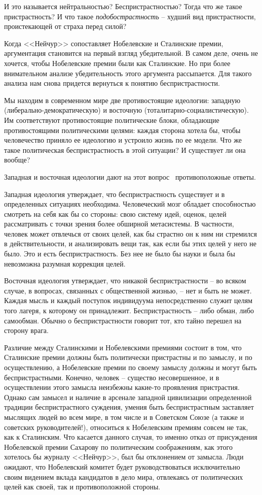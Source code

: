 \documentclass{book}
\begin{document}
И это называется нейтральностью? Беспристрастностью? Тогда что же такое пристрастность? И что такое \textit{подобостра­стность} --  худший вид пристрастности, проистекающей от стра­ха перед силой?

Когда <<Нейчур>> сопоставляет Нобелевские и Сталинские премии, аргументация становится на первый взгляд убедитель­ной. В самом деле, очень не хочется, чтобы Нобелевские пре­мии были как Сталинские. Но при более внимательном анали­зе убедительность этого аргумента рассыпается. Для такого анализа нам снова придется вернуться к понятию бесприст­растности.

Мы находим в современном мире две противостоящие иде­ологии: западную (либерально-демократическую) и восточ­ную (тоталитарно-социалистическую). Им соответствуют проти­востоящие политические блоки, обладающие противостоящи­ми политическими целями: каж\-дая сторона хотела бы, чтобы человечество приняло ее идеологию и устроило жизнь по ее модели. Что же такое политическая беспристрастность в этой ситуации? И существует ли она вообще?

Западная и восточная идеологии дают на этот вопрос  проти­воположные ответы.

Западная идеология утверждает, что беспристрастность су­ществует и в определенных ситуациях необходима. Человече­ский мозг обладает способностью смотреть на себя как бы со стороны: свою систему идей, оценок, целей рассматривать с точки зрения более обширной метасистемы. В частности, человек может отвлечься от своих целей, как бы страстно он к ним ни стремился в действительности, и анализировать вещи так, как если бы этих целей у него не было. Это и есть беспристрастность. Без нее не было бы науки и была бы невозможна разумная коррекция целей.

Восточная идеология утверждает, что никакой беспристрастности -- во всяком случае, в вопросах, связанных с общественной жизнью, -- нет и быть не может. Каждая мысль и каждый поступок индивидуума непосредственно служит целям того лагеря, к которому он принадлежит. Беспристрастность -- либо обман, либо самообман. Обычно о беспристрастности говорит тот, кто тайно перешел на сторону врага.

Различие между Сталинскими и Нобелевскими премиями состоит в том, что Сталинские премии должны быть политически пристрастны и по замыслу, и по осуществлению, а Нобелевские премии по своему замыслу должны и могут быть беспристрастными. Конечно, человек -- существо несовершенное, и в осуществлении этого замысла неизбежны какие-то проявления пристрастия. Однако сам замысел и наличие в арсенале западной цивилизации определенной традиции беспристрастного суждения, умения быть беспристрастным заставляет мыслящих людей во всем мире, в том числе и в Советском Союзе (а также и советских руководителей!), относиться к Нобелевским премиям совсем не так, как к Сталинским. Что ка­сается данного случая, то именно отказ от присуждения Нобе­левской премии Сахарову по политическим соображениям, как этого хотелось бы журналу <<Нейчур>>, был бы отклонением от замысла. Люди ожидают, что Нобелевский комитет будет руководствоваться исключительно своим видением вклада кандидатов в дело мира, отвлекаясь от политических целей как 
своей,
 так и противоположной стороны.
\end{document}

